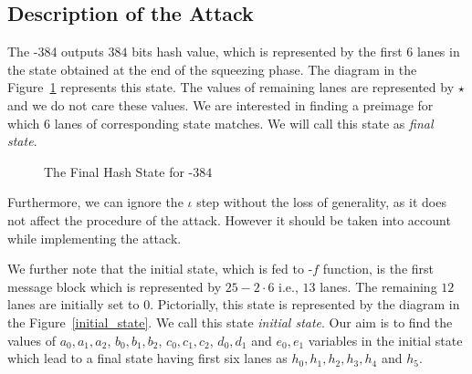 \subsection{Description of the Attack}
The \Keccak-{384} outputs $384$ bits hash value, which is represented by the first $6$ lanes in the state obtained at the end of the squeezing phase. The diagram in the Figure~\ref{initial_sq} represents this state. The values of remaining lanes are represented by $\star$ and we do not care these values. We are interested in finding a preimage for which $6$ lanes of corresponding state matches. We will call this state as \emph{final state}.
\begin{figure}[ht]
\begin{center}
\end{center}
\caption{The Final Hash State for \KECCAK-$384$ \label{initial_sq}}
\end{figure}
Furthermore, we can ignore the {$\iota$} step without the loss of generality, as it does not affect the procedure of the attack. However it should be taken into account while implementing the attack.

We further note that the initial state, which is fed to \Keccak-$f$ function, is the first message block which is represented by $25-2\cdot 6$ i.e., $13$ lanes. The remaining $12$ lanes are initially set to $0$. Pictorially, this state is represented by the diagram in the Figure~\ref{initial_state}. We call this state \emph{initial state}.
Our aim is to find the values of $a_0, a_1, a_2$, $b_0, b_1, b_2$, $c_0, c_1, c_2$, $d_0, d_1$ and $e_0, e_1$ variables in the initial state which lead to a final state having first six lanes as $h_0, h_1, h_2,h_3, h_4$ and $h_5$. 

